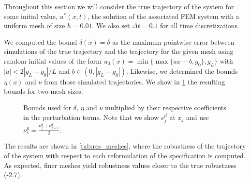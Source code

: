 \documentclass[letterpaper, 10 pt, conference]{ieeeconf/ieeeconf}
\begin{document}
Throughout this
section we will consider the true trajectory of the system for some initial
value, $u^*(x, t)$, the solution of the associated FEM system with a uniform mesh of
size $h = 0.01$. We also set $\Delta t = 0.1$ for all time discretizations.

We computed the bound $\delta(x) = \delta$ as the maximum pointwise
error between simulations of the true trajectory and the trajectory for the
given mesh using random initial values of the form $u_0(x) = \min\{\max\{a x +
b, g_0\}, g_L\}$ with $|a| < 2 |g_L - g_0| / L$ and $b \in (0, |g_L - g_0|)$.
Likewise, we determined the bounds $\eta(x)$ and $\nu$ from those simulated
trajectories. We show in \cref{fig:bounds} the resulting bounds for two mesh
sizes.

\begin{figure}[!t]
    \centering 
        \hfill
        \hfill
    \caption{Bounds used for $\delta$, $\eta$ and $\nu$ multiplied by their
    respective coefficients in the perturbation terms. Note that we show $\nu^d_j$ at
    $x_j$ and use $\nu_e^y = \frac{\nu^d_j + \nu^d_{j+1}}{2}$.}
    \label{fig:bounds}
\end{figure}

The results are shown in \cref{tab:res_meshes}, where the robustness of the
trajectory of the system with respect to each reformulation of the specification
is computed. As expected, finer meshes
yield robustness values closer to the true robustness (-2.7).
\end{document}
